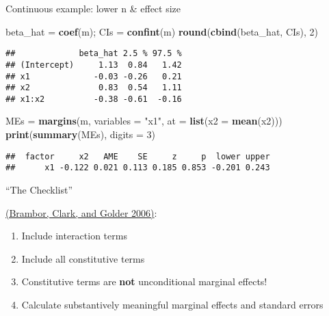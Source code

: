 \documentclass[
  ignorenonframetext,
]{beamer}
\newenvironment{Shaded}{\begin{snugshade}}{\end{snugshade}}
\newcommand{\AttributeTok}[1]{\textcolor[rgb]{0.13,0.29,0.53}{#1}}
\newcommand{\DecValTok}[1]{\textcolor[rgb]{0.00,0.00,0.81}{#1}}
\newcommand{\FunctionTok}[1]{\textcolor[rgb]{0.13,0.29,0.53}{\textbf{#1}}}
\newcommand{\NormalTok}[1]{#1}
\newcommand{\OtherTok}[1]{\textcolor[rgb]{0.56,0.35,0.01}{#1}}
\newcommand{\StringTok}[1]{\textcolor[rgb]{0.31,0.60,0.02}{#1}}
\providecommand{\tightlist}{%
  \setlength{\itemsep}{0pt}\setlength{\parskip}{0pt}}
\newcommand{\setsep}{\setlength{\itemsep}{3pt}}
\newcommand{\setskip}{\setlength{\parskip}{3pt}}
\renewcommand{\tightlist}{\setsep\setskip}
\begin{document}
\begin{frame}[fragile]{Continuous example: lower n \& effect size}
\protect\hypertarget{continuous-example-lower-n-effect-size-1}{}
\begin{Shaded}
\begin{Highlighting}[]
\NormalTok{beta\_hat }\OtherTok{=} \FunctionTok{coef}\NormalTok{(m); CIs }\OtherTok{=} \FunctionTok{confint}\NormalTok{(m)}
\FunctionTok{round}\NormalTok{(}\FunctionTok{cbind}\NormalTok{(beta\_hat, CIs), }\DecValTok{2}\NormalTok{)}
\end{Highlighting}
\end{Shaded}

\begin{verbatim}
##             beta_hat 2.5 % 97.5 %
## (Intercept)     1.13  0.84   1.42
## x1             -0.03 -0.26   0.21
## x2              0.83  0.54   1.11
## x1:x2          -0.38 -0.61  -0.16
\end{verbatim}

\pause

\begin{Shaded}
\begin{Highlighting}[]
\NormalTok{MEs }\OtherTok{=} \FunctionTok{margins}\NormalTok{(m, }\AttributeTok{variables =} \StringTok{"x1"}\NormalTok{, }\AttributeTok{at =} \FunctionTok{list}\NormalTok{(}\AttributeTok{x2 =} \FunctionTok{mean}\NormalTok{(x2)))}
\FunctionTok{print}\NormalTok{(}\FunctionTok{summary}\NormalTok{(MEs), }\AttributeTok{digits =} \DecValTok{3}\NormalTok{)}
\end{Highlighting}
\end{Shaded}

\begin{verbatim}
##  factor     x2   AME    SE     z     p  lower upper
##      x1 -0.122 0.021 0.113 0.185 0.853 -0.201 0.243
\end{verbatim}
\end{frame}

\begin{frame}{``The Checklist''}
\protect\hypertarget{the-checklist}{}
\pause

\href{https://www.jstor.org/stable/25791835}{(Brambor, Clark, and Golder 2006)}:

\pause

\begin{enumerate}[<+->]
\tightlist
\item
  Include interaction terms
\item
  Include all constitutive terms
\item
  Constitutive terms are \textbf{not} unconditional marginal effects!
\item
  Calculate substantively meaningful marginal effects and standard errors
\end{enumerate}
\end{frame}
\end{document}

